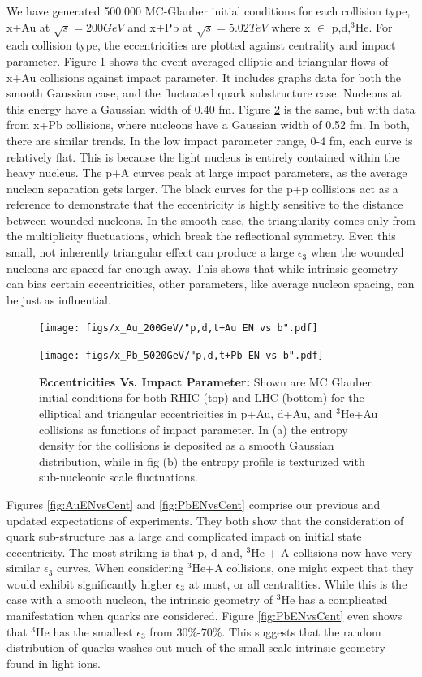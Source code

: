 \documentclass[preprint,showpacs,amsfonts,aps,prl,nofootinbib,floatfix]{revtex4}
\begin{document}
We have generated 500,000 MC-Glauber initial conditions for each collision type, x+Au at $\sqrt{s} = 200GeV$ and x+Pb at $\sqrt{s} = 5.02TeV$ where x $\in$ {p,d,$^3$He}. For each collision type, the eccentricities are plotted against centrality and impact parameter. Figure \ref{fig:AuENvsB} shows the event-averaged elliptic and triangular flows of x+Au collisions against impact parameter. It includes graphs data for both the smooth Gaussian case, and the fluctuated quark substructure case. Nucleons at this energy have a Gaussian width of 0.40 fm. Figure \ref{fig:PbENvsB} is the same, but with data from x+Pb collisions, where nucleons have a Gaussian width of 0.52 fm. In both, there are similar trends. In the low impact parameter range, 0-4 fm, each curve is relatively flat. This is because the light nucleus is entirely contained within the heavy nucleus. The p+A curves peak at large impact parameters, as the average nucleon separation gets larger. The black curves for the p+p collisions act as a reference to demonstrate that the eccentricity is highly sensitive to the distance between wounded nucleons. In the smooth case, the triangularity comes only from the multiplicity fluctuations, which break the reflectional symmetry. Even this small, not inherently triangular effect can produce a large $\epsilon_3$ when the wounded nucleons are spaced far enough away. This shows that while intrinsic geometry can bias certain eccentricities, other parameters, like average nucleon spacing, can be just as influential.
\begin{figure}[ht]
	\centering
	\texttt{[image: figs/x\_Au\_200GeV/"p,d,t+Au EN vs b".pdf]}
	\caption{}
	\label{fig:AuENvsB}
\end{figure}
\begin{figure}
	\centering
	\texttt{[image: figs/x\_Pb\_5020GeV/"p,d,t+Pb EN vs b".pdf]}
    \caption{\textbf{Eccentricities Vs. Impact Parameter:}  Shown are MC Glauber initial conditions for both RHIC (top) and LHC (bottom) for the elliptical and triangular eccentricities in p+Au, d+Au, and $^3$He+Au collisions as functions of impact parameter. In  (a) the entropy density for the collisions is deposited as a smooth Gaussian distribution, while in fig (b) the entropy profile is texturized with sub-nucleonic scale fluctuations. }
    \label{fig:PbENvsB}
\end{figure}
Figures \ref{fig:AuENvsCent} and \ref{fig:PbENvsCent} comprise our previous and updated expectations of experiments. They both show that the consideration of quark sub-structure has a large and complicated impact on initial state eccentricity. The most striking is that p, d and, $^3$He + A collisions now have very similar $\epsilon_3$ curves. When considering $^3$He+A collisions, one might expect that they would exhibit significantly higher $\epsilon_3$ at most, or all centralities. While this is the case with a smooth nucleon, the intrinsic geometry of $^3$He has a complicated manifestation when quarks are considered. Figure \ref{fig:PbENvsCent} even shows that $^3$He has the smallest $\epsilon_3$ from 30\%-70\%. This suggests that the random distribution of quarks washes out much of the small scale intrinsic geometry found in light ions. 
\end{document}
